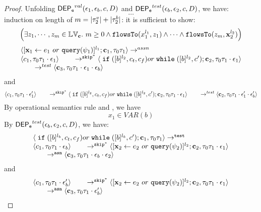 \documentclass[a4paper,11pt]{article}
\begin{document}
\begin{proof}
Unfolding $\mathsf{DEP_{\mathtt{e}}}^{val}(\mathtt{\epsilon}_1, \mathtt{\epsilon}_b, c, D)$ and $\mathsf{DEP_{\mathtt{e}}}^{test}(\mathtt{\epsilon}_b, \mathtt{\epsilon}_2, c, D)$, we have:
\[
	\ldots
\]
induction on length of $m = |\mathtt{\tau}_2^v| + |\mathtt{\tau}_2^b|$:
it is sufficient to show:
 \[\Big( \exists z_1, \cdots, z_m \in \mathbb{LV}_{{\boldsymbol{\mathbf{c}}}}. ~ m \geq 0 \land
	\mathtt{flowsTo}(x_1^{l_1}, z_1) 
	\land \cdots \land \mathtt{flowsTo}(z_m, {\boldsymbol{\mathbf{x}}}_2^{l_2}) \Big)
	\]
\[
\begin{array}{l}
	\langle [\mathrel{ {\boldsymbol{\mathbf{x}}}_1 \leftarrow e_1~ or ~ {\tt query}(\psi_1) }]^{l_1} ; {\boldsymbol{\mathbf{c}}}_1, \mathtt{\tau}_0 \mathtt{\tau}_1 \rangle  \rightarrow^{assn}
\\ 
 \langle c_1, \mathtt{\tau}_0 \mathtt{\tau}_1 \cdot \mathtt{\epsilon}_1 \rangle 
  \qquad \rightarrow^{\mathtt{skip}^*} 
  \langle \;\mathtt{if}\;([b]^{l_2}, c_t, c_f) or \;\mathtt{while}\;([b]^{l_2}, c');{\boldsymbol{\mathbf{c}}}_2, 
  \mathtt{\tau}_0 \mathtt{\tau}_1 \cdot \mathtt{\epsilon}_1 \rangle 
  \\
  \qquad \rightarrow^{test} 
  \langle {\boldsymbol{\mathbf{c}}}_3,  \mathtt{\tau}_0 \mathtt{\tau}_1 \cdot \mathtt{\epsilon}_1 \cdot \mathtt{\epsilon}_b \rangle 
 \end{array}
\]
and
\[
	 \langle c_1, \mathtt{\tau}_0 \mathtt{\tau}_1 \cdot \mathtt{\epsilon}_1' \rangle 
  \qquad \rightarrow^{\mathtt{skip}^*} 
  \langle \;\mathtt{if}\;([b]^{l_2}, c_t, c_f) or \;\mathtt{while}\;([b]^{l_2}, c');{\boldsymbol{\mathbf{c}}}_2, 
  \mathtt{\tau}_0 \mathtt{\tau}_1 \cdot \mathtt{\epsilon}_1 \rangle 
  \\
  \qquad \rightarrow^{test} 
  \langle {\boldsymbol{\mathbf{c}}}_2,  \mathtt{\tau}_0 \mathtt{\tau}_1 \cdot \mathtt{\epsilon}_1' \cdot \mathtt{\epsilon}_b' \rangle 
\]
By operational semantics rule  and , we have 
\[
	x_1 \in VAR(b)
\]
By $\mathsf{DEP_{\mathtt{e}}}^{test}(\mathtt{\epsilon}_b, \mathtt{\epsilon}_2, c, D)$, we have:
\[
\begin{array}{l}
	\langle \;\mathtt{if}\;([b]^{l_b}, c_t, c_f) or \;\mathtt{while}\;([b]^{l_b}, c'); {\boldsymbol{\mathbf{c}}}_1, \mathtt{\tau}_0 \mathtt{\tau}_1 \rangle  \rightarrow^{\mathtt{{test}}}
\\ 
 \langle c_1, \mathtt{\tau}_0 \mathtt{\tau}_1 \cdot \mathtt{\epsilon}_b \rangle 
  \qquad \rightarrow^{\mathtt{skip}^*} 
  \langle [\mathrel{ {\boldsymbol{\mathbf{x}}}_2 \leftarrow e_2 ~ or ~ {\tt query}(\psi_2) }]^{l_2};{\boldsymbol{\mathbf{c}}}_2, 
  \mathtt{\tau}_0 \mathtt{\tau}_1 \cdot \mathtt{\epsilon}_1 \rangle 
  \\
  \qquad \rightarrow^{\mathtt{{asn}}} 
  \langle {\boldsymbol{\mathbf{c}}}_3,  \mathtt{\tau}_0 \mathtt{\tau}_1 \cdot \mathtt{\epsilon}_b \cdot \mathtt{\epsilon}_2 \rangle 
 \end{array}
\]
and
\[
\begin{array}{l}
	\langle c_1, \mathtt{\tau}_0 \mathtt{\tau}_1 \cdot \mathtt{\epsilon}_b' \rangle 
  \qquad \rightarrow^{\mathtt{skip}^*} 
  \langle [\mathrel{ {\boldsymbol{\mathbf{x}}}_2 \leftarrow e_2 ~ or ~ {\tt query}(\psi_2) }]^{l_2};{\boldsymbol{\mathbf{c}}}_2, 
  \mathtt{\tau}_0 \mathtt{\tau}_1 \cdot \mathtt{\epsilon}_1 \rangle 
  \\
  \qquad \rightarrow^{\mathtt{{asn}}} 
  \langle {\boldsymbol{\mathbf{c}}}_3,  \mathtt{\tau}_0 \mathtt{\tau}_1 \cdot \mathtt{\epsilon}_b' \rangle 
 \end{array}\]

\end{proof}
\end{document}
